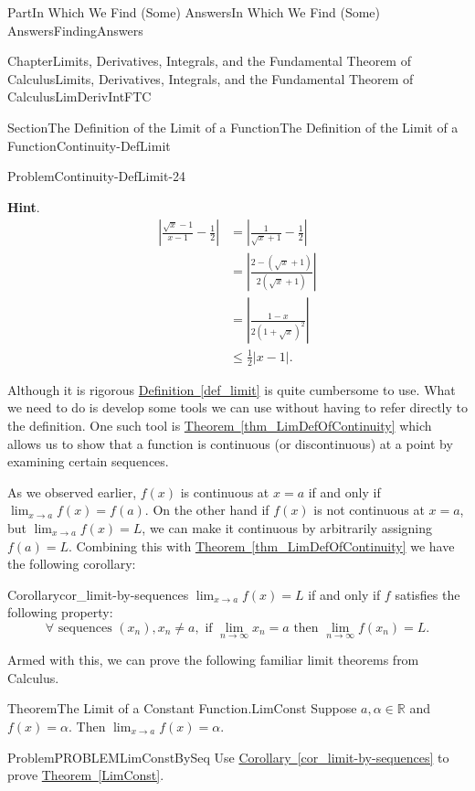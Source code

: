 \documentclass[oneside,10pt,]{book}
\newcommand{\blocktitlefont}{\relax}
\newcommand{\xreffont}{\relax}
\numberwithin{equation}{part}
\newcommand{\abs}[1]{\left|#1\right|}
\def\limit#1#2#3{{\displaystyle\lim_{#1\rightarrow #2}#3}}
\newcommand{\RR}{\mathbb {R}}
\newcommand{\amp}{&}
\begin{document}
\begin{partptx}{Part}{In Which We Find (Some) Answers}{}{In Which We Find (Some) Answers}{}{}{FindingAnswers}
\begin{chapterptx}{Chapter}{Limits, Derivatives, Integrals, and the Fundamental Theorem of Calculus}{}{Limits, Derivatives, Integrals, and the Fundamental Theorem of Calculus}{}{}{LimDerivIntFTC}
\begin{sectionptx}{Section}{The Definition of the Limit of a Function}{}{The Definition of the Limit of a Function}{}{}{Continuity-DefLimit}
\begin{problem}{Problem}{}{Continuity-DefLimit-24}
\begin{enumerate}[font=\bfseries,label=(\alph*),ref=\alph*]
\par\smallskip%
\noindent\textbf{\blocktitlefont Hint}.\hypertarget{Continuity-DefLimit-24-4-2}{}\quad{}%
\begin{align*}
\abs{\frac{\sqrt{x}-1}{x-1}-\frac12}\amp =
\abs{\frac{1}{\sqrt{x}+1}-\frac12} \\
\amp
=\abs{\frac{2-\left(\sqrt{x}+1\right)}{2\left(\sqrt{x}+1\right)}}\\
\amp
=\abs{\frac{1-x}{2\left(1+\sqrt{x}\right)^2}} \\
\amp \leq\frac12\abs{x-1}.  
\end{align*}
%
\end{enumerate}%
\end{problem}
Although it is rigorous \hyperref[def_limit]{Definition~{\xreffont\ref{def_limit}}} is quite cumbersome to use. What we need to do is develop some tools we can use without having to refer directly to the definition.  One such tool is \hyperref[thm_LimDefOfContinuity]{Theorem~{\xreffont\ref{thm_LimDefOfContinuity}}} which allows us to show that a function is continuous (or discontinuous) at a point by examining certain sequences.%
\par
As we observed earlier, \(f(x)\) is continuous at \(x=a\) if and only if \(\limit{x}{a}{f(x)} = f(a)\). On the other hand if \(f(x)\) is not continuous at \(x=a\), but \(\limit{x}{a}{f(x)}=L \), we can make it continuous by arbitrarily assigning \(f(a)=L\).    Combining this with \hyperref[thm_LimDefOfContinuity]{Theorem~{\xreffont\ref{thm_LimDefOfContinuity}}} we have the following corollary:                 %
\begin{corollary}{Corollary}{}{}{cor_limit-by-sequences}%
\(\limit{x}{a}{f(x)}=L\) if and only if \(f\) satisfies the following property:%
\begin{equation*}
\forall \text{ sequences } (x_n),
x_n\ne a, \text{ if } \limit{n}{\infty}{x_n}=a \text{ then }
\limit{n}{\infty}{f(x_n)}=L. {} 
\end{equation*}
%
\end{corollary}
Armed with this, we can prove the following familiar limit theorems from Calculus.%
\begin{theorem}{Theorem}{The Limit of a Constant Function.}{}{LimConst}%
Suppose \(a, \alpha \in \RR \) and \(f(x)=\alpha \). Then \(\limit{x}{a}{f(x)} = \alpha.\)%
\end{theorem}
\begin{problem}{Problem}{}{PROBLEMLimConstBySeq}%
Use \hyperref[cor_limit-by-sequences]{Corollary~{\xreffont\ref{cor_limit-by-sequences}}} to prove \hyperref[LimConst]{Theorem~{\xreffont\ref{LimConst}}}.%

\end{problem}
\end{sectionptx}
\end{chapterptx}
\end{partptx}
\end{document}
